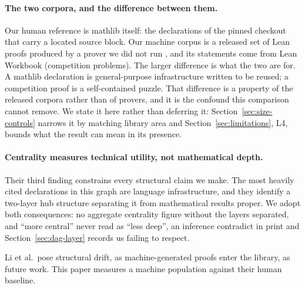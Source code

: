 \paragraph{The two corpora, and the difference between them.} Our human
reference is mathlib itself: the \humanProofs{} declarations of the pinned
checkout that carry a located source block. Our machine corpus is a released
set of \machineProofs{} Lean proofs produced by a prover we did not run
\citep{goedelprover}, and its statements come from Lean Workbook
(competition problems). The larger difference is what the two are for. A mathlib declaration is general-purpose
infrastructure written to be reused; a competition proof is a self-contained
puzzle. That difference is a property of the released corpora rather than of
provers, and it is the confound this comparison cannot remove. We state it
here rather than deferring it: Section~\ref{sec:size-controls} narrows it by
matching library area and Section~\ref{sec:limitations}, L4, bounds what the
result can mean in its presence.

\paragraph{Centrality measures technical utility, not mathematical depth.}
Their third finding constrains every structural claim we make. The most heavily
cited declarations in this graph are language infrastructure, and they identify
a two-layer hub structure separating it from mathematical results proper. We
adopt both consequences: no aggregate centrality figure without the layers
separated, and ``more central'' never read as ``less deep'', an inference
\citet{li2026network} contradict in print and
Section~\ref{sec:dag-layer} records us failing to respect.

Li et al.\ pose structural drift, as machine-generated proofs enter the library,
as future work. This paper measures a machine population against their human
baseline.

